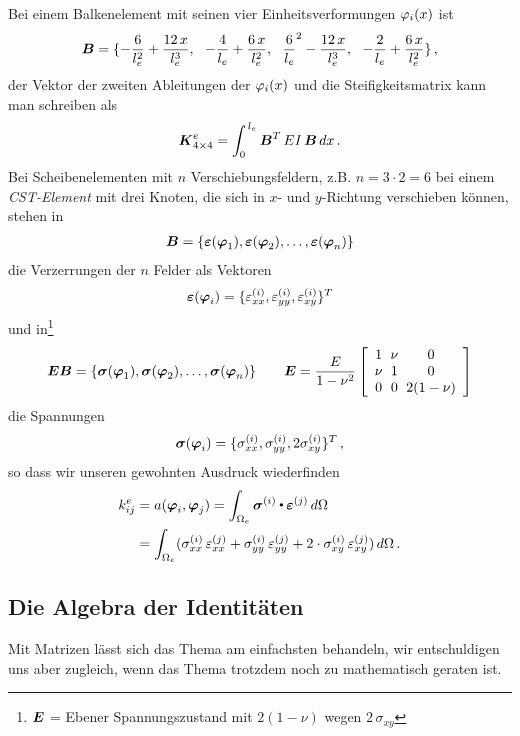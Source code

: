 Bei einem Balkenelement mit seinen vier Einheitsverformungen $\varphi_i(x)$ ist
\begin{align}
\mbox{\boldmath $B$} = \{-\frac{6}{l_e^2} + \frac{12\,x}{l_e^3},\,\, \,\,- \frac{4}{l_e} + \frac{6\,x}{l_e^2}, \,\,\,\,\frac{6}{l_e}^2 - \frac{12\,x}{l_e^3}, \,\,\,\,- \frac{2}{l_e} + \frac{6\,x}{l_e^2}\}\,,
\end{align}
der Vektor der zweiten Ableitungen der $\varphi_i(x)$ und die Steifigkeitsmatrix kann man schreiben als
\begin{align}
\mbox{\boldmath $K$}^e_{4 \times 4} = \int_0^{\,l_e} \mbox{\boldmath $B$}^T\,EI\,\mbox{\boldmath $B$}\,dx\,.
\end{align}
Bei Scheibenelementen mit $n$ Verschiebungsfeldern, z.B. $n = 3 \cdot 2 = 6$ bei einem {\em CST-Element\/} mit drei Knoten, die sich in $x$- und $y$-Richtung verschieben k\"{o}nnen, stehen in
\begin{align}
\mbox{\boldmath $B$} = \{ \mbox{\boldmath $\varepsilon$}(\mbox{\boldmath $\varphi$}_1), \mbox{\boldmath $\varepsilon$}(\mbox{\boldmath $\varphi$}_2), \ldots, \mbox{\boldmath $\varepsilon$}(\mbox{\boldmath $\varphi$}_n) \}
\end{align}
die Verzerrungen der $n$ Felder als Vektoren
\begin{align}
\mbox{\boldmath $\varepsilon$}(\mbox{\boldmath $\varphi$}_i) = \{\varepsilon_{xx}^{(i)}, \varepsilon_{yy}^{(i)}, \varepsilon_{xy}^{(i)}\}^T
\end{align}
und in\footnote{$\mbox{\boldmath $E$}$ = Ebener Spannungszustand mit $2 (1-\nu)$ wegen $2\,\sigma_{xy}$}
\begin{align}
\vek E \vek B =  \{ \vek \sigma(\vek \Np_1), \vek \sigma(\vek \Np_2), \ldots, \vek \sigma(\vek \Np_n) \} \qquad\vek E = \frac{E}{1 - \nu^2}\left [ \barr{c  @{\hspace{2mm}} c  @{\hspace{2mm}} c} 1 & \nu & 0 \\ \nu & 1 & 0 \\ 0 & 0 & 2(1-\nu) \earr \right]
\end{align}
die Spannungen
\begin{align}
\mbox{\boldmath $\sigma$}(\mbox{\boldmath $\varphi$}_i) = \{\sigma_{xx}^{(i)}, \sigma_{yy}^{(i)}, 2 \sigma_{xy}^{(i)}\}^T\,,
\end{align}
so dass wir unseren gewohnten Ausdruck wiederfinden
\begin{align}
k_{ij }^e &= a(\mbox{\boldmath $\varphi$}_i,\mbox{\boldmath $\varphi$}_j) = \int_{\Omega_e} \mbox{\boldmath $\sigma$}^{(i)} {\,\scriptscriptstyle \stackrel{\bullet}{{}}}\, \mbox{\boldmath $\varepsilon$}^{(j)} \,d\Omega \nonumber \\
&= \int_{\Omega_e} (\sigma_{xx}^{(i)}\,\varepsilon_{xx}^{(j)} + \sigma_{yy}^{(i)}\,\varepsilon_{yy}^{(j)}+ 2 \cdot \sigma_{xy}^{(i)}\,\varepsilon_{xy}^{(j)} ) \,d\Omega\,.
\end{align}
\pagebreak
\textcolor{sectionTitleBlue}{\section{Die Algebra der Identit\"{a}ten}}
Mit Matrizen l\"{a}sst sich das Thema am einfachsten behandeln, wir entschuldigen uns aber zugleich, wenn das Thema trotzdem noch zu mathematisch geraten ist.

